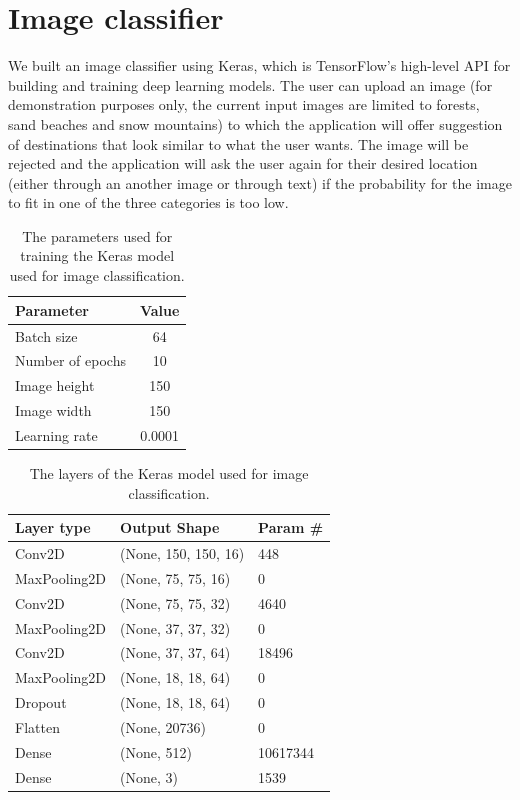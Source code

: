 \documentclass[runningheads,a4paper,11pt]{report}
\begin{document}
\section{Image classifier}
\label{section:imageClassifier}
We built an image classifier using Keras, which is TensorFlow's high-level API for building and training deep learning models. The user can upload an image (for demonstration purposes only, the current input images are limited to forests, sand beaches and snow mountains) to which the application will offer suggestion of destinations that look similar to what the user wants. The image will be rejected and the application will ask the user again for their desired location (either through an another image or through text) if the probability for the image to fit in one of the three categories is too low.


\begin{table}[H]
	\caption{The parameters used for training the Keras model used for image classification.}
	\begin{center}
		\begin{tabular}{p{220pt}c}
			\textbf{Parameter}& \textbf{Value} \\
			\hline\hline
			Batch size & 64 \\
			Number of epochs & 10 \\
			Image height & 150 \\
			Image width & 150 \\
			Learning rate & 0.0001 \\
		\end{tabular}
	\end{center}
\end{table}


\begin{table}[H]
	\caption{The layers of the Keras model used for image classification.}
	\begin{center}
		\begin{tabular}{p{120pt}p{150pt}p{70pt}}
			\textbf{Layer type} & \textbf{Output Shape} & \textbf{Param \#} \\
			\hline\hline
			Conv2D & (None, 150, 150, 16) & 448 \\
			MaxPooling2D & (None, 75, 75, 16) & 0 \\
			Conv2D & (None, 75, 75, 32) & 4640 \\
			MaxPooling2D & (None, 37, 37, 32) & 0 \\
			Conv2D & (None, 37, 37, 64) & 18496 \\
			MaxPooling2D & (None, 18, 18, 64) & 0 \\
			Dropout & (None, 18, 18, 64) & 0 \\
			Flatten & (None, 20736) & 0 \\
			Dense & (None, 512) & 10617344 \\
			Dense & (None, 3) & 1539 \\
		\end{tabular}
	\end{center}
\end{table}
		
\end{document}
